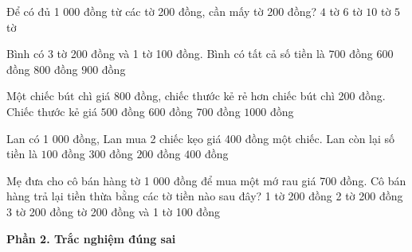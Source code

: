 \begin{ex} %
Để có đủ 1 000 đồng từ các tờ 200 đồng, cần mấy tờ 200 đồng?
\choice
{$4$ tờ}
{$6$ tờ}
{$10$ tờ}
{\True $5$ tờ}
\end{ex}

\begin{ex} %
Bình có 3 tờ 200 đồng và 1 tờ 100 đồng. Bình có tất cả số tiền là
\choice
{\True $700$ đồng}
{$600$ đồng}
{$800$ đồng}
{$900$ đồng}
\end{ex}

\begin{ex} %
Một chiếc bút chì giá 800 đồng, chiếc thước kẻ rẻ hơn chiếc bút chì 200 đồng. Chiếc thước kẻ giá
\choice
{$500$ đồng}
{\True $600$ đồng}
{$700$ đồng}
{$1000$ đồng}
\end{ex}

\begin{ex} %
Lan có 1 000 đồng, Lan mua 2 chiếc kẹo giá 400 đồng một chiếc. Lan còn lại số tiền là
\choice
{$100$ đồng}
{$300$ đồng}
{\True $200$ đồng}
{$400$ đồng}
\end{ex}

\begin{ex} %
Mẹ đưa cho cô bán hàng tờ 1 000 đồng để mua một mớ rau giá 700 đồng. Cô bán hàng trả lại tiền thừa bằng các tờ tiền nào sau đây?
\choice
{1 tờ 200 đồng}
{2 tờ 200 đồng}
{3 tờ 200 đồng}
{ tờ 200 đồng và 1 tờ 100 đồng}
\end{ex}

\textbf{Phần 2. Trắc nghiệm đúng sai}

